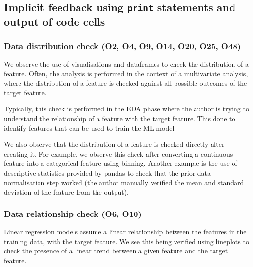 \subsection{Implicit feedback using \texttt{print} statements and output of code cells}

\subsubsection{Data distribution check (O2, O4, O9, O14, O20, O25, O48)}

We observe the use of visualisations and dataframes to check the distribution of a feature. Often, the analysis is performed in the context of a multivariate analysis, where the distribution of a feature is checked against all possible outcomes of the target feature.

Typically, this check is performed in the EDA phase where the author is trying to understand the relationship of a feature with the target feature. This done to identify features that can be used to train the ML model.

We also observe that the distribution of a feature is checked directly after creating it. For example, we observe this check after converting a continuous feature into a categorical feature using binning. Another example is the use of descriptive statistics provided by pandas to check that the prior data normalisation step worked (the author manually verified the mean and standard deviation of the feature from the output).

\subsubsection{Data relationship check (O6, O10)}

Linear regression models assume a linear relationship between the features in the training data, with the target feature. We see this being verified using lineplots to check the presence of a linear trend between a given feature and the target feature.

